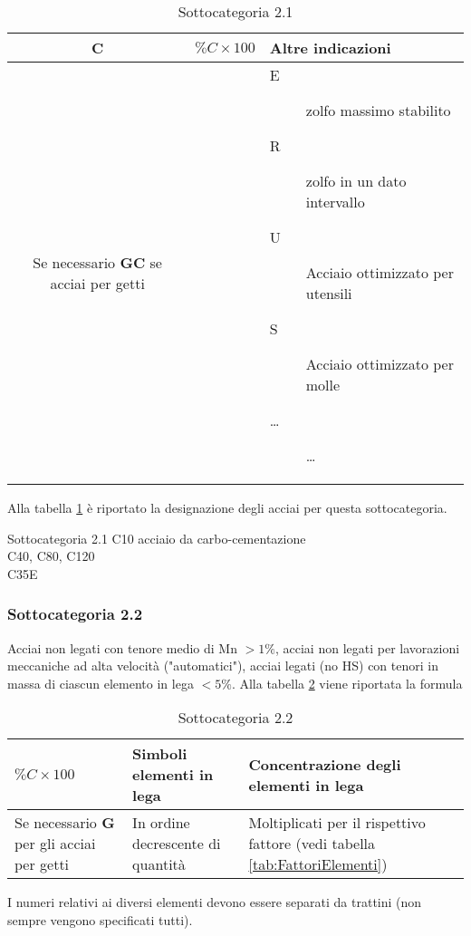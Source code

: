 \begin{table}
\centering
\caption{Sottocategoria 2.1}
\label{tab:Sotto1}
\begin{tabularx}{\textwidth}{|c|X|X|}
\toprule
\textbf{C} & \textbf{$\%C \times 100$} & \textbf{Altre indicazioni}\\
\midrule
Se necessario \textbf{GC} se acciai per getti
&&
\begin{description}
\item[E] zolfo massimo stabilito
\item[R] zolfo in un dato intervallo
\item[U] Acciaio ottimizzato per utensili
\item[S] Acciaio ottimizzato per molle
\item[\dots] \dots
\end{description}\\
\bottomrule
\end{tabularx}
\end{table}

Alla tabella \ref{tab:Sotto1} è riportato la designazione degli acciai per questa sottocategoria.

\begin{example}{Sottocategoria 2.1}
C10 acciaio da carbo-cementazione\\
C40, C80, C120\\
C35E
\end{example}

\subsubsection{Sottocategoria 2.2}\label{sssc:Sottogruppo2.2}
Acciai non legati con tenore medio di Mn $>1\%$, acciai non legati per lavorazioni meccaniche ad alta velocità ("automatici"), acciai legati (no HS) con tenori in massa di ciascun elemento in lega $<5\%$. Alla tabella \ref{tab:Sotto2} viene riportata la formula

\begin{table}
\centering
\caption{Sottocategoria 2.2}\label{tab:Sotto2}
\begin{tabularx}{\textwidth}{|X|X|X|}
\toprule
\textbf{$\%C \times 100$} & \textbf{Simboli elementi in lega} & \textbf{Concentrazione degli elementi in lega}\\
\midrule
Se necessario \textbf{G} per gli acciai per getti &
In ordine decrescente di quantità &
Moltiplicati per il rispettivo fattore (vedi tabella \ref{tab:FattoriElementi})\\
\bottomrule
\end{tabularx}
\end{table}
I numeri relativi ai diversi elementi devono essere separati da trattini (non sempre vengono specificati tutti).


